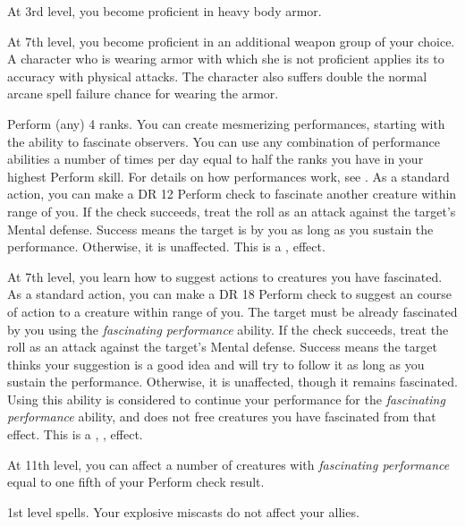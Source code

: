     At 3rd level, you become proficient in heavy body armor.

    At 7th level, you become proficient in an additional weapon group of your choice.
    A character who is wearing armor with which she is not proficient applies its  to accuracy with physical attacks.
    The character also suffers double the normal arcane spell failure chance for wearing the armor.

    \featpre Perform (any) 4 ranks.
    \featben You can create mesmerizing performances, starting with the ability to fascinate observers.
    You can use any combination of performance abilities a number of times per day equal to half the ranks you have in your highest Perform skill.
    For details on how performances work, see .
    \featben As a standard action, you can make a DR 12 Perform check to fascinate another creature within \rngmed range of you.
    If the check succeeds, treat the roll as an attack against the target's Mental defense.
    Success means the target is \fascinated by you as long as you sustain the performance.
    Otherwise, it is unaffected.
    This is a ,  effect.

    At 7th level, you learn how to suggest actions to creatures you have fascinated.
    As a standard action, you can make a DR 18 Perform check to suggest an course of action to a creature within \rngmed range of you.
    The target must be already fascinated by you using the \textit{fascinating performance} ability.
    If the check succeeds, treat the roll as an attack against the target's Mental defense.
    Success means the target thinks your suggestion is a good idea and will try to follow it as long as you sustain the performance.
    Otherwise, it is unaffected, though it remains fascinated.
    Using this ability is considered to continue your performance for the \textit{fascinating performance} ability, and does not free creatures you have fascinated from that effect.
    This is a , ,  effect.

    At 11th level, you can affect a number of creatures with \textit{fascinating performance} equal to one fifth of your Perform check result.

    \featpre 1st level spells.
    \featben Your explosive miscasts do not affect your allies.

